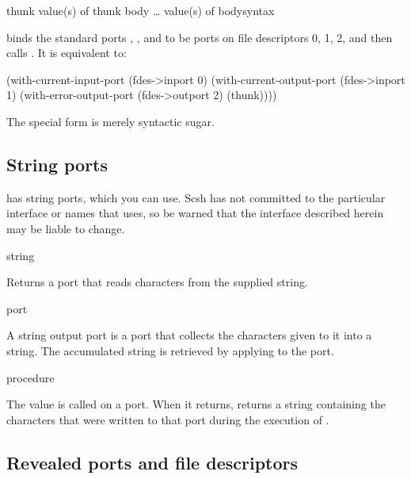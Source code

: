  {thunk} {value(s) of thunk}
 {body \ldots} {value(s) of body}{syntax}
\begin{desc}
     binds the standard ports , 
    , and  to be ports
    on file descriptors 0, 1, 2, and then calls .
    It is equivalent to:
\begin{code}
(with-current-input-port (fdes->inport 0)
  (with-current-output-port (fdes->inport 1)
    (with-error-output-port (fdes->outport 2)
      (thunk))))\end{code}
%
The  special form is merely syntactic sugar.
\end{desc}




\subsection{String ports}
{\scm} has string ports, which you can use. Scsh has not committed to the
particular interface or names that {\scm} uses, so be warned that the
interface described herein may be liable to change.

 {string} {\port}
\begin{desc}
  Returns a port that reads characters from the supplied string.
\end{desc}

 {} {\port}
 {port} {\str}
\begin{desc}
A string output port is a port that collects the characters given to it into
a string.
The accumulated string is retrieved by applying 
to the port.
\end{desc}

 {procedure} {\str}
\begin{desc}
  The  value is called on a port.  When it returns, 
   returns a string containing the 
  characters that were written to that port during the execution
  of .
\end{desc}

\subsection{Revealed ports and file descriptors}

